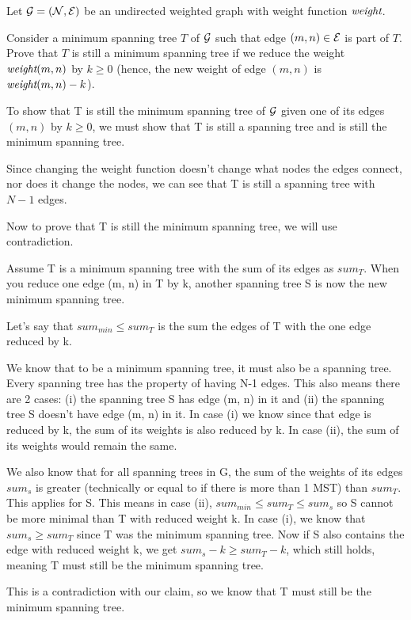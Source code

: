 \begin{problem}
Let $\mathcal{G} = (\mathcal{N}, \mathcal{E})$ be an undirected weighted graph with weight function $\mathord{\textit{weight}}$. 
\begin{questions}
\item Consider a minimum spanning tree $T$ of $\mathcal{G}$ such that edge $(m, n) \in \mathcal{E}$ is part of $T$. Prove that $T$ is still a minimum spanning tree if we reduce the weight $\mathord{\textit{weight}}{(m, n)}$ by $k \geq 0$ (hence, the new weight of edge $(m, n)$ is $\mathord{\textit{weight}}{(m, n)} - k$).

To show that T is still the minimum spanning tree of $\mathcal{G}$ given one of its edges $(m, n)$ by $k \geq 0$, we must show that T is still a spanning tree and is still the minimum spanning tree.

Since changing the weight function doesn't change what nodes the edges connect, nor does it change the nodes, we can see that T is still a spanning tree with $N-1$ edges.

Now to prove that T is still the minimum spanning tree, we will use contradiction.

Assume T is a minimum spanning tree with the sum of its edges as $sum_T$. When you reduce one edge (m, n) in T by k, another spanning tree S is now the new minimum spanning tree.

Let's say that $sum_{min} \leq sum_T$ is the sum the edges of T with the one edge reduced by k. 

We know that to be a minimum spanning tree, it must also be a spanning tree. 
Every spanning tree has the property of having N-1 edges. This also means there are 2 cases: 
(i) the spanning tree S has edge (m, n) in it and (ii) the spanning tree S doesn't have edge (m, n) in it.
In case (i) we know since that edge is reduced by k, the sum of its weights is also reduced by k. In case (ii), the sum of its weights would remain the same.

We also know that for all spanning trees in G, the sum of the weights of its edges $sum_s$ is greater (technically or equal to if there is more than 1 MST) than $sum_T$. This applies for S.
This means in case (ii), $sum_{min} \leq sum_T \leq sum_s$ so S cannot be more minimal than T with reduced weight k.
In case (i), we know that $sum_s \geq sum_T$ since T was the minimum spanning tree. Now if S also contains the edge with reduced weight k, we get
$sum_s - k \geq sum_T - k$, which still holds, meaning T must still be the minimum spanning tree.

This is a contradiction with our claim, so we know that T must still be the minimum spanning tree.


\end{questions}
\end{problem}
